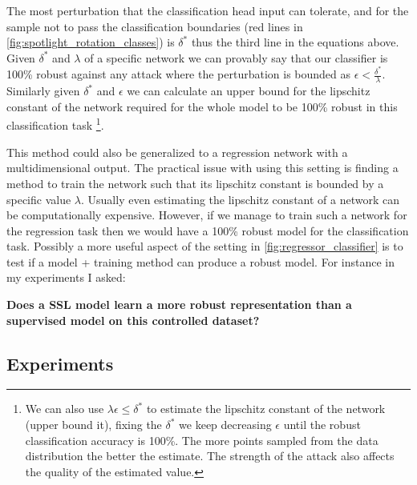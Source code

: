 \documentclass[../thesis.tex]{subfiles}
\begin{document}
The most perturbation that the classification head input can tolerate, and for the sample not to pass the classification boundaries (red lines in \ref{fig:spotlight_rotation_classes}) is $\delta^*$ thus the third line in the equations above. Given $\delta^*$ and $\lambda$ of a specific network we can provably say that our classifier is 100\% robust against any attack where the perturbation is bounded as $\epsilon < \frac{\delta^*}{\lambda}$. Similarly given $\delta^*$ and $\epsilon$ we can calculate an upper bound for the lipschitz constant of the network required for the whole model to be 100\% robust in this classification task
\footnote{ We can also use $\lambda  \epsilon \leq \delta^*$ to estimate the lipschitz constant of the network (upper bound it), fixing the $\delta^*$ we keep decreasing $\epsilon$ until the robust classification accuracy is 100\%. The more points sampled from the data distribution the better the estimate. The strength of the attack also affects the quality of the estimated value.}.


This method could also be generalized to a regression network with a multidimensional output. The practical issue with using this setting is finding a method to train the network such that its lipschitz constant is bounded by a specific value $\lambda$. Usually even estimating the lipschitz constant of a network can be computationally expensive. However, if we manage to train such a network for the regression task then we would have a 100\% robust model for the classification task. Possibly a more useful aspect of the setting in \ref{fig:regressor_classifier} is to test if a model + training method can produce a robust model. For instance in my experiments I asked:

\begin{center}
\textbf{Does a SSL model learn a more robust representation than a supervised model on this controlled dataset?}   
\end{center}

\subsection{Experiments}
\label{sec:spotlight_exp}
\end{document}

